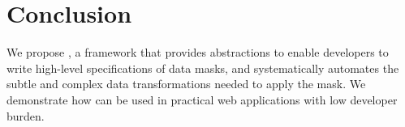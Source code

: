 \section{Conclusion}
We propose \sys, a framework that provides abstractions to enable developers to write high-level
specifications of data masks, and systematically automates the subtle and complex data
transformations needed to apply the mask. We demonstrate how \sys can be used in practical web
applications with low developer burden.

\iffalse
new paradigm of data ownership on the web that provides users with control over
when and how applications access their data, without overhauling the current web architecture and
business model. To realize \name, we design \sys, which minimizes the burden upon users to store or
manage their data, and makes it easy for developers to systematically express and automate the
subtle and complex data transformations needed for unsubscription and resubscription. We demonstrate
how \sys can be used in practical web applications with low overhead.
\fi
